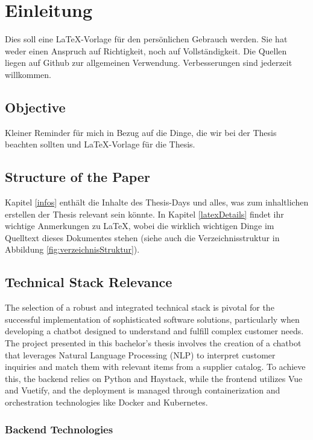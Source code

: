 \section{Einleitung}
Dies soll eine \LaTeX{}-Vorlage für den persönlichen Gebrauch werden. Sie hat weder einen Anspruch auf Richtigkeit, noch auf Vollständigkeit. Die Quellen liegen auf Github zur allgemeinen Verwendung. Verbesserungen sind jederzeit willkommen.

\subsection{Objective}
Kleiner Reminder für mich in Bezug auf die Dinge, die wir bei der Thesis beachten sollten und \LaTeX{}-Vorlage für die Thesis.\autocite{misischiaChatbotsCustomerService2022a}

\subsection{Structure of the Paper}
Kapitel \ref{infos} enthält die Inhalte des Thesis-Days und alles, was zum inhaltlichen erstellen der Thesis relevant sein könnte. In Kapitel \ref{latexDetails}  findet ihr wichtige Anmerkungen zu \LaTeX{}, wobei die wirklich wichtigen Dinge im Quelltext dieses Dokumentes stehen (siehe auch die Verzeichnisstruktur in Abbildung \ref{fig:verzeichnisStruktur}).

\subsection{Technical Stack Relevance}

The selection of a robust and integrated technical stack is pivotal for the successful implementation of sophisticated software solutions, particularly when developing a chatbot designed to understand and fulfill complex customer needs. The project presented in this bachelor’s thesis involves the creation of a chatbot that leverages Natural Language Processing (NLP) to interpret customer inquiries and match them with relevant items from a supplier catalog. To achieve this, the backend relies on Python and Haystack, while the frontend utilizes Vue and Vuetify, and the deployment is managed through containerization and orchestration technologies like Docker and Kubernetes.

\subsubsection{Backend Technologies}

